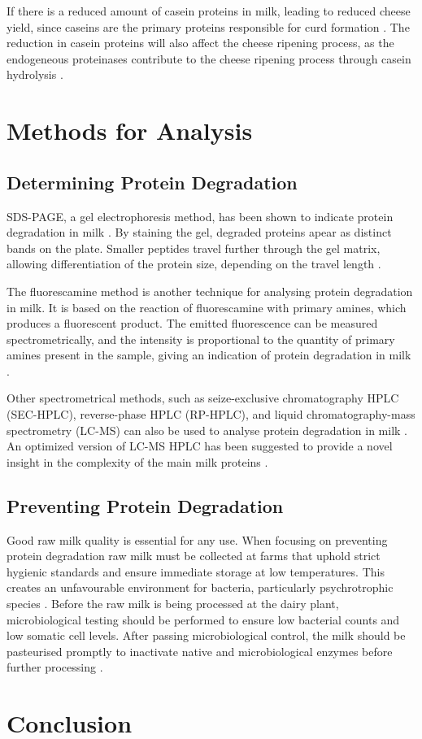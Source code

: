 If there is a reduced amount of casein proteins in milk, leading to reduced cheese yield, since caseins are the primary proteins responsible for curd formation \cite*{a02_proteases_and_protein_degradation}. The reduction in casein proteins will also affect the cheese ripening process, as the endogeneous proteinases contribute to the cheese ripening process through casein hydrolysis \cite*{a02_proteases_and_protein_degradation}.


\section{Methods for Analysis}

\subsection{Determining Protein Degradation}
SDS-PAGE, a gel electrophoresis method, has been shown to indicate protein degradation in milk \cite*{a02_proteases_and_protein_degradation}. By staining the gel, degraded proteins apear as distinct bands on the plate. Smaller peptides travel further through the gel matrix, allowing differentiation of the protein size, depending on the travel length  \cite*{a02_proteases_and_protein_degradation}.

The fluorescamine method is another technique for analysing protein degradation in milk. It is based on the reaction of fluorescamine with primary amines, which produces a fluorescent product. The emitted fluorescence can be measured spectrometrically, and the intensity is proportional to the quantity of primary amines present in the sample, giving an indication of protein degradation in milk \cite*{a02_proteases_and_protein_degradation}.

Other spectrometrical methods, such as seize-exclusive chromatography HPLC (SEC-HPLC), reverse-phase HPLC (RP-HPLC), and liquid chromatography-mass spectrometry (LC-MS) can also be used to analyse protein degradation in milk \cite*{s07_hplc_milk_components,a09_proteomics}. An optimized version of LC-MS HPLC has been suggested to provide a novel insight in the complexity of the main milk proteins \cite*{a09_proteomics}.

\subsection{Preventing Protein Degradation}
Good raw milk quality is essential for any use. When focusing on preventing protein degradation raw milk must be collected at farms that uphold strict hygienic standards and ensure immediate storage at low temperatures. This creates an unfavourable environment for bacteria, particularly psychrotrophic species \cite*{a08_shelf_life_of_heat_treated_dairy_products}. Before the raw milk is being processed at the dairy plant, microbiological testing should be performed to ensure low bacterial counts and low somatic cell levels. After passing microbiological control, the milk should be pasteurised promptly to inactivate native and microbiological enzymes before further processing \cite*{a08_shelf_life_of_heat_treated_dairy_products}. 


\section{Conclusion}

